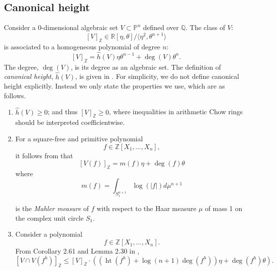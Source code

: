 \documentclass[12pt]{article}
\DeclareMathOperator{\htt}{ht}
\begin{document}
\subsection{Canonical height}\label{sec:CanonicalH}
Consider a $0$-dimensional algebraic set $V \subset \mathbb{P}^n$ defined over $\mathbb{Q}$. The class of $V:$
\[
[V]_{\mathbb{Z}} \in \mathbb{R}[\eta, \theta] / \langle \eta^2, \theta^{n+1}\rangle
\]
is associated to a homogeneous polynomial of degree $n:$
\[
[V]_{\mathbb{Z}} = \hat{h}(V) \eta \theta^{n-1} + \deg(V) \theta^{n}.
\]
The degree, $\deg(V)$, is its degree as an algebraic set. The definition of \textit{canonical height}, $\hat{h}(V)$, is given in \cite{EN}. For simplicity, we do not define canonical height explicitly. Instead we only state the properties we use, which are as follows.

\begin{enumerate}
    \item $\hat{h}(V) \geq 0$; and thus $[V]_{\mathbb{Z}} \geq 0$, where inequalities in arithmetic Chow rings should be interpreted coefficientwise.


    \item For a square-free and primitive polynomial 
    \[
    f \in \mathbb{Z}[X_1,\hdots,X_n],
    \]
    it follows from \cite[Proposition 2.53]{EN} that
    \[
    [V(f)]_{\mathbb{Z}} = m(f) \eta + \deg(f) \theta
    \]
    where \[m(f) = \int_{S_1^{n+1}} \log(|f|) d\mu^{n+1}\] 

    
    is the \textit{Mahler measure} of \(f\) with respect to the Haar measure \(\mu\) of mass 1 on the complex unit circle \(S_1\).

    \item     
    Consider a polynomial 
    \[
    f \in \mathbb{Z}[X_1,\hdots,X_n].
    \]
    From Corollary 2.61 and Lemma 2.30 in \cite{EN},
    \[
    [V \cap V(f^h)]_{\mathbb{Z}} \leq [V]_{\mathbb{Z}} \cdot 
    \left( 
    (\htt(f^h)+\log(n+1)\deg(f^h))\eta + \deg(f^h)\theta
    \right).
    \]
\end{enumerate}
\end{document}
